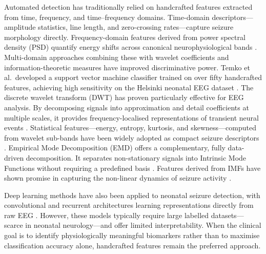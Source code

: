 \documentclass[pdflatex,sn-mathphys-num]{sn-jnl}%
\theoremstyle{thmstyleone}%
\theoremstyle{thmstyletwo}%
\theoremstyle{thmstylethree}%
\begin{document}
Automated detection has traditionally relied on handcrafted features extracted from time, frequency, and time--frequency domains. Time-domain descriptors---amplitude statistics, line length, and zero-crossing rates---capture seizure morphology directly. Frequency-domain features derived from power spectral density (PSD) quantify energy shifts across canonical neurophysiological bands \cite{greene2008}. Multi-domain approaches combining these with wavelet coefficients and information-theoretic measures have improved discriminative power. Temko et al.\ developed a support vector machine classifier trained on over fifty handcrafted features, achieving high sensitivity on the Helsinki neonatal EEG dataset \cite{temko2011}. The discrete wavelet transform (DWT) has proven particularly effective for EEG analysis. By decomposing signals into approximation and detail coefficients at multiple scales, it provides frequency-localised representations of transient neural events \cite{adeli2003}. Statistical features---energy, entropy, kurtosis, and skewness---computed from wavelet sub-bands have been widely adopted as compact seizure descriptors \cite{subasi2007}. Empirical Mode Decomposition (EMD) offers a complementary, fully data-driven decomposition. It separates non-stationary signals into Intrinsic Mode Functions without requiring a predefined basis \cite{huang1998}. Features derived from IMFs have shown promise in capturing the non-linear dynamics of seizure activity \cite{pan2024}.

Deep learning methods have also been applied to neonatal seizure detection, with convolutional and recurrent architectures learning representations directly from raw EEG \cite{ansari2019, kashefiamiri2025}. However, these models typically require large labelled datasets---scarce in neonatal neurology---and offer limited interpretability. When the clinical goal is to identify physiologically meaningful biomarkers rather than to maximise classification accuracy alone, handcrafted features remain the preferred approach.




\end{document}
